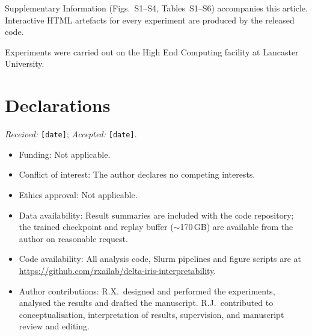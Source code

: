 \documentclass[pdflatex,sn-mathphys-num]{sn-jnl}%
\theoremstyle{thmstyleone}%
\theoremstyle{thmstyletwo}%
\theoremstyle{thmstylethree}%
\begin{document}
\backmatter

Supplementary Information (Figs.~S1--S4, Tables~S1--S6) accompanies this article. Interactive HTML artefacts for every experiment are produced by the released code.

Experiments were carried out on the High End Computing facility at Lancaster University.

\section*{Declarations}
\noindent\textit{Received:} \texttt{[date]}; \textit{Accepted:} \texttt{[date]}.
\begin{itemize}
\item Funding: Not applicable.
\item Conflict of interest: The author declares no competing interests.
\item Ethics approval: Not applicable.
\item Data availability: Result summaries are included with the code repository; the trained checkpoint and replay buffer ($\sim$170\,GB) are available from the author on reasonable request.
\item Code availability: All analysis code, Slurm pipelines and figure scripts are at \url{https://github.com/rxailab/delta-iris-interpretability}.
\item Author contributions: R.X.\ designed and performed the experiments, analysed the results and drafted the manuscript. R.J.\ contributed to conceptualisation, interpretation of results, supervision, and manuscript review and editing.
\end{itemize}


\end{document}
